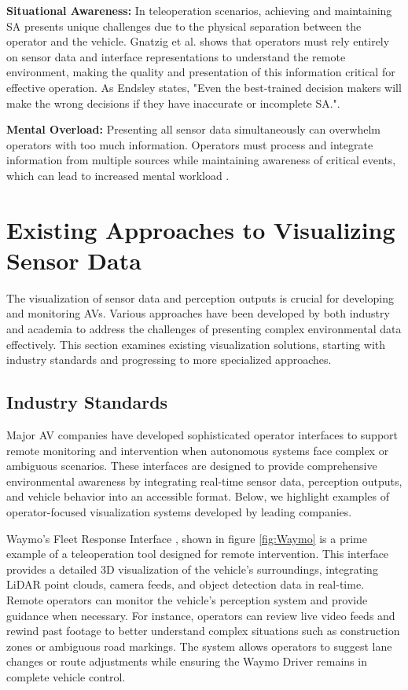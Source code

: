 \textbf{Situational Awareness:} In teleoperation scenarios, achieving and maintaining \ac{SA} presents unique challenges due to the physical separation between the operator and the vehicle. Gnatzig et al. \cite{Gnatzig} shows that operators must rely entirely on sensor data and interface representations to understand the remote environment, making the quality and presentation of this information critical for effective operation.  As Endsley \cite{endsley1995toward} states, "Even the
best-trained decision makers will make the wrong decisions if they have inaccurate or incomplete SA.".

\textbf{Mental Overload:} Presenting all sensor data simultaneously can overwhelm operators with too much information.
Operators must process and integrate information from multiple sources while maintaining awareness of critical events, which can lead to increased mental workload \cite{wickens2008multiple}.

\section{Existing Approaches to Visualizing Sensor Data}
The visualization of sensor data and perception outputs is crucial for developing and monitoring \acp{AV}. Various approaches have been developed by both industry and academia to address the challenges of presenting complex environmental data effectively. This section examines existing visualization solutions, starting with industry standards and progressing to more specialized approaches.
\subsection{Industry Standards}
Major \ac{AV} companies have developed sophisticated operator interfaces to support remote monitoring and intervention when autonomous systems face complex or ambiguous scenarios. These interfaces are designed to provide comprehensive environmental awareness by integrating real-time sensor data, perception outputs,
and vehicle behavior into an accessible format. Below, we highlight examples of operator-focused visualization systems developed by leading companies.

Waymo's Fleet Response Interface \cite{waymo2024fleetresponse}, shown in figure \ref{fig:Waymo} is a prime example of a teleoperation tool designed for remote intervention. This interface provides a detailed 3D visualization of the vehicle’s surroundings, integrating \ac{LiDAR} point clouds, camera feeds, and object detection data in real-time. Remote operators can monitor the vehicle’s perception system and provide guidance when necessary. For instance, operators can review live video feeds and rewind past footage to better understand complex situations such as construction zones or ambiguous road markings. The system allows operators to suggest lane changes or route adjustments while ensuring the Waymo Driver remains in complete vehicle control.

